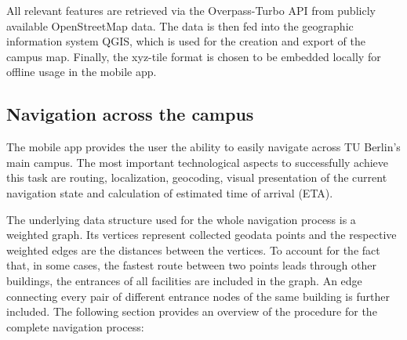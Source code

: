 All relevant features are retrieved via the Overpass-Turbo API from publicly available OpenStreetMap data. The data is then fed into the geographic information system QGIS, which is used for the creation and export of the campus map. Finally, the xyz-tile format is chosen to be embedded locally for offline usage in the mobile app.

\subsection{Navigation across the campus}
The mobile app provides the user the ability to easily navigate across TU Berlin's main campus. The most important technological aspects to successfully achieve this task are routing, localization, geocoding, visual presentation of the current navigation state and calculation of estimated time of arrival (ETA).

The underlying data structure used for the whole navigation process is a weighted graph. Its vertices represent collected geodata points and the respective weighted edges are the distances between the vertices. To account for the fact that, in some cases, the fastest route between two points leads through other buildings, the entrances of all facilities are included in the graph. An edge connecting every pair of different entrance nodes of the same building is further included. The following section provides an overview of the procedure for the complete navigation process:

